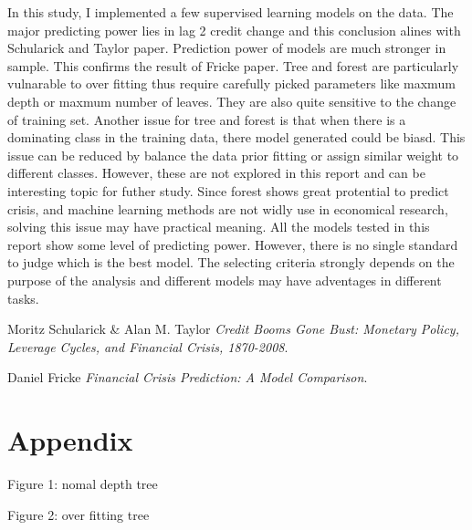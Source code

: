 \documentclass{article}
\newcommand{\ciapdf}[1]{\vspace*{-\parskip}\begin{center}\resizebox{0.75\textwidth}{!}{\texttt{[image: \#1]}}\end{center}}
\begin{document}
In this study, I implemented
a few supervised learning models on the data. The major predicting
power lies in lag 2 credit change and this conclusion alines with
Schularick and Taylor paper. Prediction power of models are much stronger in sample. This confirms the result of Fricke
paper. Tree and forest are particularly
vulnarable to over fitting thus require carefully picked parameters like
maxmum depth or maxmum number of leaves. They are also quite sensitive
to the change of training set. Another issue for
tree and forest is that when there is a dominating class in the training
data, there model generated could be biasd. This issue can be reduced by
balance the data prior fitting or assign similar weight to different
classes. However, these are not explored in this report and can be
interesting topic for futher study. Since forest shows great protential
to predict crisis, and machine learning methods are not widly use in
economical research, solving this issue may have practical meaning. All
the models tested in this report show some level of predicting power.
However, there is no single standard to judge which is the best model.
The selecting criteria strongly depends on the purpose of the analysis
and different models may have adventages in different tasks.

\begin{thebibliography}{9}
Moritz Schularick \& Alan M. Taylor
\textit{Credit Booms Gone Bust: Monetary Policy, Leverage Cycles, and Financial Crisis, 1870-2008}.

Daniel Fricke
\textit{Financial Crisis Prediction: A Model Comparison}.
\end{thebibliography}

\section*{Appendix}

Figure 1: nomal depth tree

\ciapdf{app_normaldepth.pdf}

Figure 2: over fitting tree 
\end{document}
